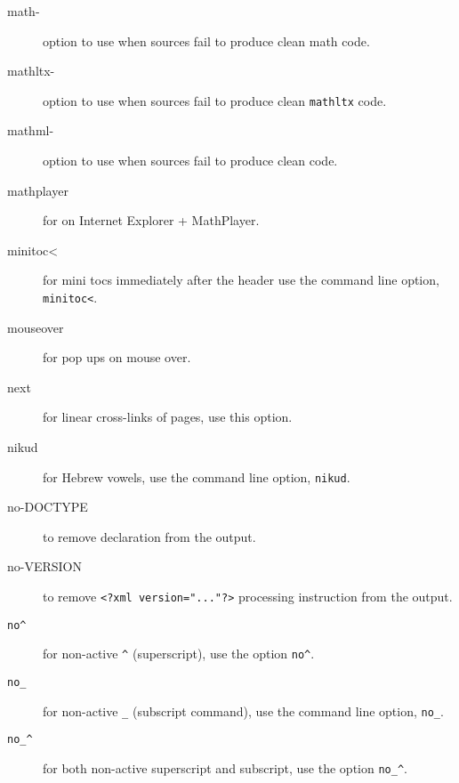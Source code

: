 \documentclass[a4paper]{article}
\begin{document}
\begin{description}
\item[math-] option to use when sources fail to produce clean math
  code.


\item[mathltx-] option to use when sources fail to produce clean
  \verb=mathltx= code.

\item[mathml-] option to use when sources fail to produce clean
  \mathml code.

\item[mathplayer] for \mathml on Internet Explorer + MathPlayer.

\item[minitoc<] for mini tocs immediately after the header use the
  command line option, \verb=minitoc<=.

\item[mouseover] for pop ups on mouse over.


\item[next] for linear cross-links of pages, use this option.

\item[nikud] for Hebrew vowels, use the command line option,
  \verb=nikud=.

\item[no-DOCTYPE] to remove \space declaration from
  the output.

\item[no-VERSION] to remove \verb+<?xml version="..."?>+ processing
  instruction from the output.


\item[\tt no^] for non-active \verb=^= (superscript), use the option
  \verb=no^=.

\item[\tt no_] for non-active \verb=_= (subscript command), use the
  command line option, \verb=no_=.

\item[\tt no_^] for both non-active superscript and subscript, use the
  option \verb=no_^=.


\end{description}
\end{document}
